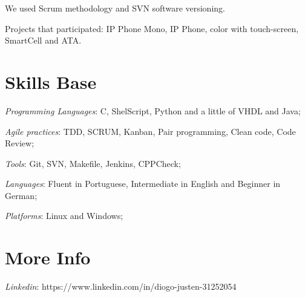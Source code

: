 \documentclass[margin]{res}
\begin{document}
\begin{resume}
We used Scrum methodology and SVN software versioning.

Projects that participated: IP Phone Mono, IP Phone, color with touch-screen, SmartCell and ATA. 

\section{Skills Base} \textit{Programming Languages}: C, ShelScript, Python and a little of VHDL and Java;

 \textit{Agile practices}: TDD, SCRUM, Kanban, Pair programming, Clean code, Code Review;
 
 \textit{Tools}: Git, SVN, Makefile, Jenkins, CPPCheck;
 
 \textit{Languages}: Fluent in Portuguese, Intermediate in English and Beginner in German;

 \textit{Platforms}: Linux and Windows;
 
\section{More Info} \textit{Linkedin}: https://www.linkedin.com/in/diogo-justen-31252054

\end{resume}
\end{document}
